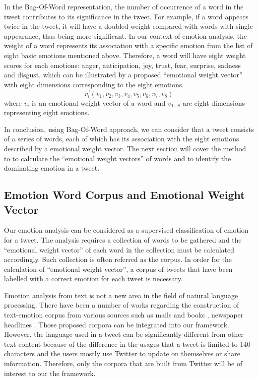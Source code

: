 In the Bag-Of-Word representation, the number of occurrence of a word in the tweet contributes to its significance in the tweet. For example, if a word appears twice in the tweet, it will have a doubled weight compared with words with single appearance, thus being more significant. In our context of emotion analysis, the weight of a word represents its association with a specific emotion from the list of eight basic emotions mentioned above. Therefore, a word will have eight weight scores for each emotions: anger, anticipation, joy, trust, fear, surprise, sadness and disgust, which can be illustrated by a proposed ``emotional weight vector'' with eight dimensions corresponding to the eight emotions. 
\[
	\vec{v_i}(v_1, v_2, v_3, v_4, v_5, v_6, v_7, v_8)
\] where \(v_i\) is an emotional weight vector of a word and \(v_{1...8}\) are eight dimensions representing eight emotions.

In conclusion, using Bag-Of-Word approach, we can consider that a tweet consists of a series of words, each of which has its association with the eight emotions described by a emotional weight vector. The next section will cover the method to to calculate the ``emotional weight vectors'' of words and to identify the dominating emotion in a tweet.

\subsection{Emotion Word Corpus and Emotional Weight Vector}
Our emotion analysis can be considered as a supervised classification of emotion for a tweet. The analysis requires a collection of words to be gathered and the ``emotional weight vector'' of each word in the collection must be calculated accordingly. Such collection is often referred as the corpus. In order for the calculation of ``emotional weight vector'', a corpus of tweets that have been labelled with a correct emotion for each tweet is necessary.

Emotion analysis from text is not a new area in the field of natural language processing. There have been a number of works regarding the construction of text-emotion corpus from various sources such as mails \citep{mohammad2011tracking} and books \citep{mohammad2011once}, newspaper headlines \citep{strapparava2008learning}. Those proposed corpora can be integrated into our framework. However, the language used in a tweet can be significantly different from other text content because of the difference in the usages that a tweet is limited to 140 characters and the users mostly use Twitter to update on themselves or share information. Therefore, only the corpora that are built from Twitter will be of interest to our the framework.

